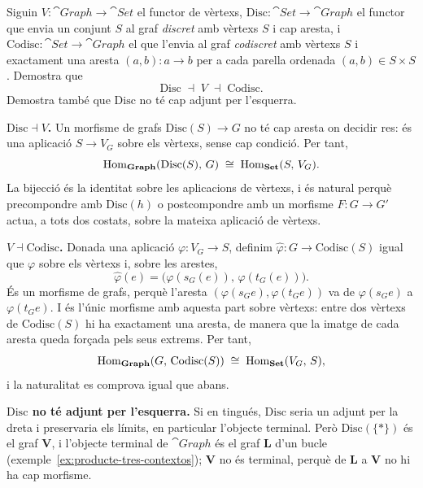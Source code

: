 \begin{exercici}\label{pr-adjunts-grafs}
Siguin $V\colon\cat{Graph}\to\cat{Set}$ el functor de vèrtexs, $\mathrm{Disc}\colon\cat{Set}\to\cat{Graph}$ el functor que envia un conjunt $S$ al graf \emph{discret} amb vèrtexs $S$ i cap aresta, i $\mathrm{Codisc}\colon\cat{Set}\to\cat{Graph}$ el que l'envia al graf \emph{codiscret} amb vèrtexs $S$ i exactament una aresta $(a,b)\colon a\to b$ per a cada parella ordenada $(a,b)\in S\times S$. Demostra que
\[
\mathrm{Disc}\;\dashv\;V\;\dashv\;\mathrm{Codisc}.
\]
Demostra també que $\mathrm{Disc}$ no té cap adjunt per l'esquerra.
\end{exercici}

\begin{solucio}
\textbf{$\mathrm{Disc}\dashv V$.} Un morfisme de grafs $\mathrm{Disc}(S)\to G$ no té cap aresta on decidir res: és una aplicació $S\to V_G$ sobre els vèrtexs, sense cap condició. Per tant,
\[
\operatorname{Hom}_{\mathbf{Graph}}(\mathrm{Disc}(S),\,G)\;\cong\;\operatorname{Hom}_{\mathbf{Set}}(S,\,V_G).
\]
La bijecció és la identitat sobre les aplicacions de vèrtexs, i és natural perquè precompondre amb $\mathrm{Disc}(h)$ o postcompondre amb un morfisme $F\colon G\to G'$ actua, a tots dos costats, sobre la mateixa aplicació de vèrtexs.

\textbf{$V\dashv\mathrm{Codisc}$.} Donada una aplicació $\varphi\colon V_G\to S$, definim $\widehat\varphi\colon G\to\mathrm{Codisc}(S)$ igual que $\varphi$ sobre els vèrtexs i, sobre les arestes,
\[
\widehat\varphi(e)=\bigl(\varphi(s_G(e)),\,\varphi(t_G(e))\bigr).
\]
És un morfisme de grafs, perquè l'aresta $(\varphi(s_G e),\varphi(t_G e))$ va de $\varphi(s_G e)$ a $\varphi(t_G e)$. I és l'únic morfisme amb aquesta part sobre vèrtexs: entre dos vèrtexs de $\mathrm{Codisc}(S)$ hi ha exactament una aresta, de manera que la imatge de cada aresta queda forçada pels seus extrems. Per tant,
\[
\operatorname{Hom}_{\mathbf{Graph}}(G,\,\mathrm{Codisc}(S))\;\cong\;\operatorname{Hom}_{\mathbf{Set}}(V_G,\,S),
\]
i la naturalitat es comprova igual que abans.

\textbf{$\mathrm{Disc}$ no té adjunt per l'esquerra.} Si en tingués, $\mathrm{Disc}$ seria un adjunt per la dreta i preservaria els límits, en particular l'objecte terminal. Però $\mathrm{Disc}(\{\ast\})$ és el graf $\mathbf V$, i l'objecte terminal de $\cat{Graph}$ és el graf $\mathbf L$ d'un bucle (exemple~\ref{ex:producte-tres-contextos}); $\mathbf V$ no és terminal, perquè de $\mathbf L$ a $\mathbf V$ no hi ha cap morfisme.


\end{solucio}
